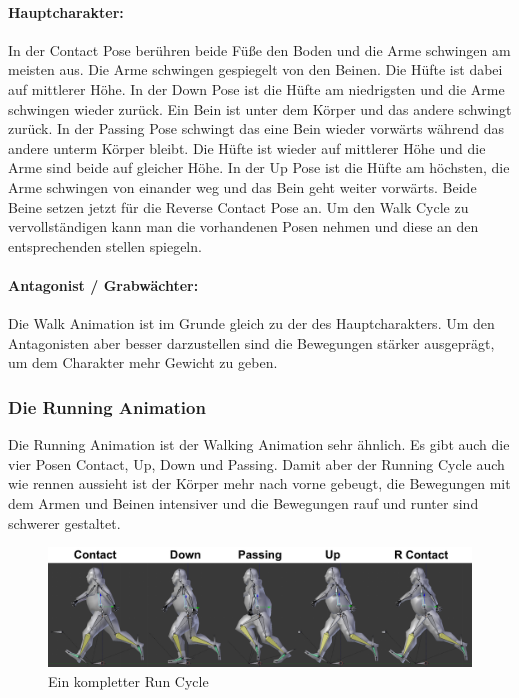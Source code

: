\paragraph{Hauptcharakter:}
In der Contact Pose berühren beide Füße den Boden und die Arme schwingen am meisten aus. Die Arme schwingen gespiegelt von den Beinen.
Die Hüfte ist dabei auf mittlerer Höhe. In der Down Pose ist die Hüfte am niedrigsten und die Arme schwingen wieder zurück.
Ein Bein ist unter dem Körper und das andere schwingt zurück. In der Passing Pose schwingt das eine Bein wieder vorwärts während
das andere unterm Körper bleibt. Die Hüfte ist wieder auf mittlerer Höhe und die Arme sind beide auf gleicher Höhe. In der Up Pose
ist die Hüfte am höchsten, die Arme schwingen von einander weg und das Bein geht weiter vorwärts. Beide Beine setzen jetzt
für die Reverse Contact Pose an. Um den Walk Cycle zu vervollständigen kann man die vorhandenen Posen nehmen und diese an den entsprechenden stellen spiegeln.

\paragraph{Antagonist / Grabwächter:}
Die Walk Animation ist im Grunde gleich zu der des Hauptcharakters.
Um den Antagonisten aber besser darzustellen sind die Bewegungen stärker ausgeprägt, um dem Charakter mehr Gewicht zu geben.

\subsubsection{Die Running Animation}
Die Running Animation ist der Walking Animation sehr ähnlich.
Es gibt auch die vier Posen Contact, Up, Down und Passing. Damit aber der Running Cycle auch wie rennen aussieht ist der Körper mehr nach vorne gebeugt,
die Bewegungen mit dem Armen und Beinen intensiver und die Bewegungen rauf und runter sind schwerer gestaltet.

\begin{figure}[H]
    \centering

    \includegraphics[width=.8\textwidth]{images/animation_run_cycle.png}
    \caption{Ein kompletter Run Cycle}
\end{figure}

